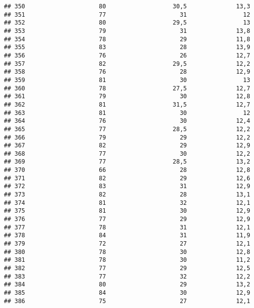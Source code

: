 \documentclass[
]{article}
\begin{document}
\begin{verbatim}
## 350                     80                   30,5              13,3
## 351                     77                     31                12
## 352                     80                   29,5                13
## 353                     79                     31              13,8
## 354                     78                     29              11,8
## 355                     83                     28              13,9
## 356                     76                     26              12,7
## 357                     82                   29,5              12,2
## 358                     76                     28              12,9
## 359                     81                     30                13
## 360                     78                   27,5              12,7
## 361                     79                     30              12,8
## 362                     81                   31,5              12,7
## 363                     81                     30                12
## 364                     76                     30              12,4
## 365                     77                   28,5              12,2
## 366                     79                     29              12,2
## 367                     82                     29              12,9
## 368                     77                     30              12,2
## 369                     77                   28,5              13,2
## 370                     66                     28              12,8
## 371                     82                     29              12,6
## 372                     83                     31              12,9
## 373                     82                     28              13,1
## 374                     81                     32              12,1
## 375                     81                     30              12,9
## 376                     77                     29              12,9
## 377                     78                     31              12,1
## 378                     84                     31              11,9
## 379                     72                     27              12,1
## 380                     78                     30              12,8
## 381                     78                     30              11,2
## 382                     77                     29              12,5
## 383                     77                     32              12,2
## 384                     80                     29              13,2
## 385                     84                     30              12,9
## 386                     75                     27              12,1

\end{verbatim}
\end{document}
